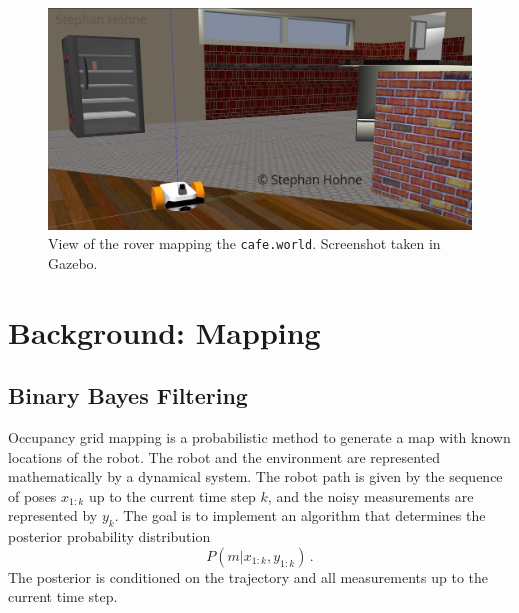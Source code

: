 \documentclass[10pt, journal, compsoc]{IEEEtran}
\begin{document}
\begin{figure}[thpb]
      \centering
      \includegraphics[width=\columnwidth]{images/rover_cafe_gazebo.jpg}
      \caption{View of the rover mapping the \texttt{cafe.world}. Screenshot taken in Gazebo.}
      \label{fig:cafe_world_gazebo_side}
\end{figure} 

\section{Background: Mapping}
\label{sec:background}
\subsection{Binary Bayes Filtering}
Occupancy grid mapping is a probabilistic method to generate a map with known locations of the robot. The robot and the environment are represented mathematically by a dynamical system. The robot path is given by the sequence of poses $x_{1:k}$ up to the current time step $k$, and the noisy measurements are represented by $y_k$. The goal is to implement an algorithm that determines the posterior probability distribution
\begin{equation}
\label{eqn:posterior_known_poses}
P\left( m \vert x_{1:k}, y_{1:k} \right) \, .
\end{equation}
The posterior is conditioned on the trajectory and all measurements up to the current time step.
\end{document}
